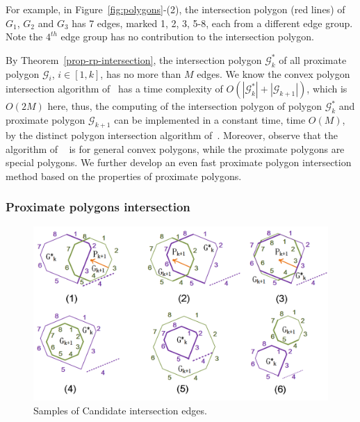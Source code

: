 For example, in Figure~\ref{fig:polygons}-(2), the intersection polygon (red lines) of $G_1$, $G_2$ and $G_3$ has 7 edges, marked 1, 2, 3, 5-8, each from a different edge group. Note the $4^{th}$ edge group has no contribution to the intersection polygon.


By Theorem~\ref{prop-rp-intersection}, the intersection polygon $\mathcal{G}^*_k$ of all proximate polygon $\mathcal{G}_i$, $i \in [1, k]$, has no more than $M$ edges.
We know the convex polygon intersection algorithm of~\cite{ORourke:Intersection} has a time complexity of $O(|\mathcal{G}^*_k| + |\mathcal{G}_{k+1}|)$, which is $O(2M)$ here, thus, the computing of the intersection polygon of polygon $\mathcal{G}^*_k$ and proximate polygon $\mathcal{G}_{k+1}$ can be implemented in a constant time, \ie time $O(M)$, by the distinct polygon intersection algorithm of~\cite{ORourke:Intersection}.
%
Moreover, observe that the algorithm of ~\cite{ORourke:Intersection} is for general convex polygons, while the proximate polygons are special polygons. We further develop an even fast proximate polygon intersection method based on the properties of proximate polygons.

\subsubsection{Proximate polygons intersection}


\begin{figure}[tb!]
\centering
\includegraphics[scale=0.88]{figures/Fig-poly-edges.png}
\vspace{-1ex}
\caption{\small Samples of Candidate intersection edges.}
\vspace{-2ex}
\label{fig:poly-edges}
\end{figure}

